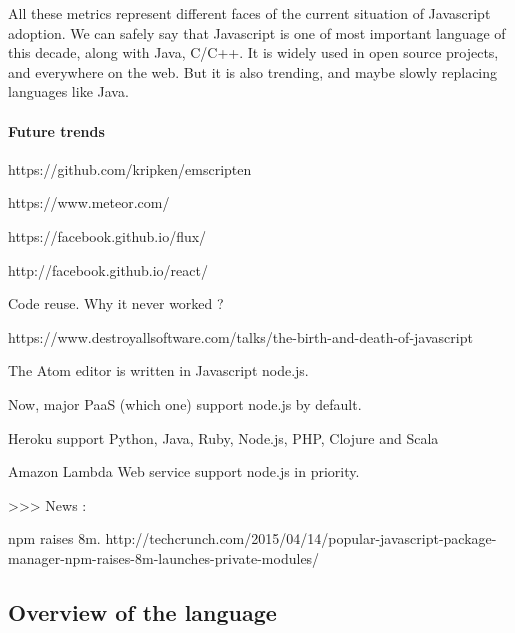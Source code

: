 All these metrics represent different faces of the current situation of Javascript adoption.
We can safely say that Javascript is one of most important language of this decade, along with Java, C/C++.
It is widely used in open source projects, and everywhere on the web.
But it is also trending, and maybe slowly replacing languages like Java.

\paragraph{Future trends}



https://github.com/kripken/emscripten


https://www.meteor.com/

https://facebook.github.io/flux/


http://facebook.github.io/react/

Code reuse.
Why it never worked ?





https://www.destroyallsoftware.com/talks/the-birth-and-death-of-javascript

The Atom editor is written in Javascript node.js.



Now, major PaaS (which one) support node.js by default.

Heroku support Python, Java, Ruby, Node.js, PHP, Clojure and Scala

Amazon Lambda Web service support node.js in priority.


>>> News :

npm raises 8m.
http://techcrunch.com/2015/04/14/popular-javascript-package-manager-npm-raises-8m-launches-private-modules/




\subsection{Overview of the language}

